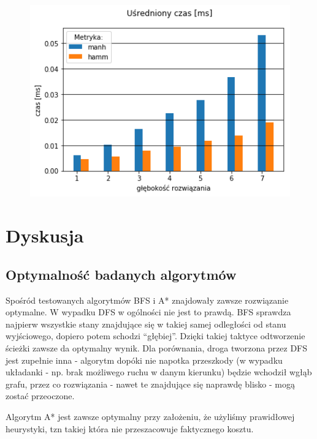 \documentclass{classrep}
\begin{document}
\begin{figure}[H]
  \centering
  \begin{minipage}{0.45\textwidth}
    \centering
    \includegraphics[width=1.1\textwidth]{output_4_4.png}
  \end{minipage}
\end{figure}

\restoregeometry

\section{Dyskusja}
\subsection{Optymalność badanych algorytmów}

Spośród testowanych algorytmów BFS i A* znajdowały zawsze rozwiązanie optymalne. W wypadku DFS w ogólności nie
jest to prawdą. BFS sprawdza najpierw wszystkie stany znajdujące się w takiej samej odległości od stanu
wyjściowego, dopiero potem schodzi ``głębiej''. Dzięki takiej taktyce odtworzenie ścieżki zawsze da optymalny wynik.
Dla porównania, droga tworzona przez DFS jest zupełnie inna - algorytm dopóki nie napotka przeszkody
(w wypadku układanki - np. brak możliwego ruchu w danym kierunku) będzie wchodził wgłąb grafu, przez co
rozwiązania - nawet te znajdujące się naprawdę blisko - mogą zostać przeoczone.

Algorytm A* jest zawsze optymalny przy założeniu, że użyliśmy prawidłowej heurystyki, tzn takiej która nie
przeszacowuje faktycznego kosztu.
\end{document}
